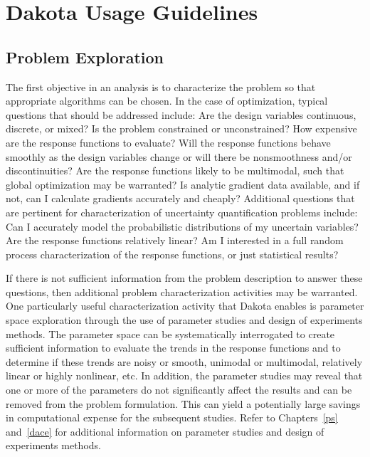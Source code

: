 \chapter{Dakota Usage Guidelines}\label{usage}

\section{Problem Exploration}\label{usage:exploration}

The first objective in an analysis is to characterize the problem so
that appropriate algorithms can be chosen. In the case of
optimization, typical questions that should be addressed include: Are
the design variables continuous, discrete, or mixed? Is the problem
constrained or unconstrained? How expensive are the response functions
to evaluate? Will the response functions behave smoothly as the design
variables change or will there be nonsmoothness and/or
discontinuities? Are the response functions likely to be multimodal,
such that global optimization may be warranted? Is analytic gradient
data available, and if not, can I calculate gradients accurately and
cheaply? Additional questions that are pertinent for characterization
of uncertainty quantification problems include: Can I accurately model
the probabilistic distributions of my uncertain variables? Are the
response functions relatively linear? Am I interested in a full random
process characterization of the response functions, or just
statistical results?

If there is not sufficient information from the problem description to
answer these questions, then additional problem characterization
activities may be warranted. One particularly useful characterization
activity that Dakota enables is parameter space exploration through
the use of parameter studies and design of experiments methods. The
parameter space can be systematically interrogated to create
sufficient information to evaluate the trends in the response
functions and to determine if these trends are noisy or smooth,
unimodal or multimodal, relatively linear or highly nonlinear, etc. In
addition, the parameter studies may reveal that one or more of the
parameters do not significantly affect the results and can be removed
from the problem formulation. This can yield a potentially large
savings in computational expense for the subsequent studies. Refer to
Chapters~\ref{ps} and~\ref{dace} for additional information on
parameter studies and design of experiments methods.

